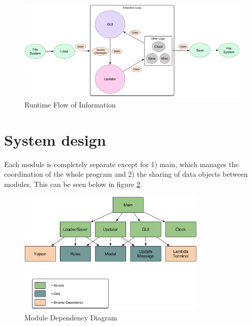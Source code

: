 \begin{figure}[H]
  \caption{Runtime Flow of Information}
  \label{fig:run}
  \vspace{3em}
  \includegraphics[width=\textwidth]{images/runtime_order}
\end{figure}

\section{System design}
Each module is completely separate except for 1) main, which manages the coordination
of the whole program and 2) the sharing of data objects between modules. This can be
seen below in figure \ref{fig:dep}.

\begin{figure}[H]
  \caption{Module Dependency Diagram}
  \label{fig:dep}
  \vspace{3em}
  \center\includegraphics[width=0.8\textwidth]{images/dependencies}
\end{figure}

